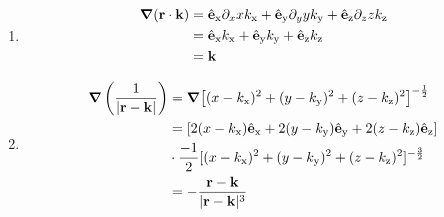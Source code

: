 \documentclass[
    headings=optiontohead,              %
    12pt,                               %
    DIV=13,                             %
    twoside=false,                      %
    open=right,                         %
    BCOR=00mm,                          %
    toc=bibliographynumbered,            %
    parskip=half,                       %
]{scrarticle}
\author{Jan Claar}
\date{\today}
\begin{document}
    \head


    \begin{enumerate}[label=\alph*)]
         \item 
             \begin{align*}
                 \grad(\vb{r}\cdot \vb{k}) &= \hat{\vb{e}}_\mathrm{x}\partial_{x} x k_\mathrm{x} +  \hat{\vb{e}}_\mathrm{y}\partial_{y} y k_\mathrm{y} +\hat{\vb{e}}_\mathrm{z}\partial_{z} z k_\mathrm{z} \\
                &= \hat{\vb{e}}_\mathrm{x}k_\mathrm{x} +  \hat{\vb{e}}_\mathrm{y}k_\mathrm{y} +\hat{\vb{e}}_\mathrm{z} k_\mathrm{z} \\
                &= \vb{k}
             \end{align*}
        \item 
            \begin{align*}
                \grad\left(\frac{1}{|\vb{r}-\vb{k}|}\right) &= \grad[(x -k_\mathrm{x})^2 + (y - k_\mathrm{y})^2 + (z - k_\mathrm{z})^2]^{-\frac{1}{2}} \\
                &= [ 2(x - k_\mathrm{x})\hat{\vb{e}}_\mathrm{x} + 2(y - k_\mathrm{y})\hat{\vb{e}}_\mathrm{y} +2(z - k_\mathrm{z})\hat{\vb{e}}_\mathrm{z}] \\
                &\cdot \frac{-1}{2}[(x -k_\mathrm{x})^2 + (y - k_\mathrm{y})^2 + (z - k_\mathrm{z})^2]^{-\frac{3}{2}} \\
                &= -\displaystyle\frac{\vb{r}- \vb{k}}{|\vb{r} - \vb{k}|^3}
            \end{align*}
    \end{enumerate}    
\end{document}

